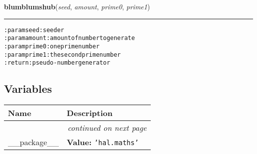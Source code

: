     \label{hal:maths:maths:blumblumshub}

    \vspace{0.5ex}

\hspace{.8\funcindent}\begin{boxedminipage}{\funcwidth}

    \raggedright \textbf{blumblumshub}(\textit{seed}, \textit{amount}, \textit{prime0}, \textit{prime1})

    \vspace{-1.5ex}

    \rule{\textwidth}{0.5\fboxrule}
\setlength{\parskip}{2ex}
\begin{alltt}

:param seed: seeder
:param amount: amount of number to generate
:param prime0: one prime number
:param prime1: the second prime number
:return: pseudo-number generator
\end{alltt}

\setlength{\parskip}{1ex}
    \end{boxedminipage}



  \subsection{Variables}

    \vspace{-1cm}
\hspace{\varindent}\begin{longtable}{|p{\varnamewidth}|p{\vardescrwidth}|l}
\cline{1-2}
\cline{1-2} \centering \textbf{Name} & \centering \textbf{Description}& \\
\cline{1-2}
\endhead\cline{1-2}\multicolumn{3}{r}{\small\textit{continued on next page}}\\\endfoot\cline{1-2}
\endlastfoot\raggedright \_\-\_\-p\-a\-c\-k\-a\-g\-e\-\_\-\_\- & \raggedright \textbf{Value:} 
{\tt \texttt{'}\texttt{hal.maths}\texttt{'}}&\\
\cline{1-2}
\end{longtable}



